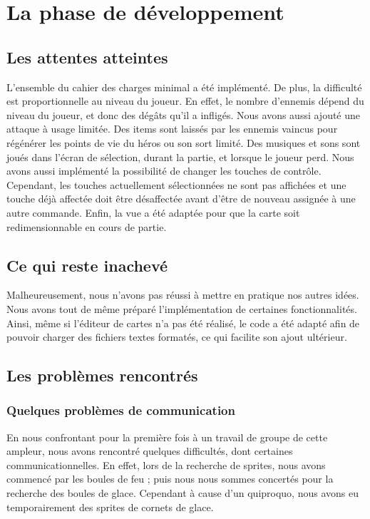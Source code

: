 \section{La phase de développement}

\subsection{Les attentes atteintes}

L'ensemble du cahier des charges minimal a été implémenté. De plus, la difficulté est proportionnelle au niveau du joueur. En effet, le nombre d'ennemis dépend du niveau du joueur, et donc des dégâts qu'il a infligés. Nous avons aussi ajouté une attaque à usage limitée. Des items sont laissés par les ennemis vaincus pour régénérer les points de vie du héros ou son sort limité. Des musiques et sons sont joués dans l'écran de sélection, durant la partie, et lorsque le joueur perd. Nous avons aussi implémenté la possibilité de changer les touches de contrôle. Cependant, les touches actuellement sélectionnées ne sont pas affichées et une touche déjà affectée doit être désaffectée avant d'être de nouveau assignée à une autre commande. Enfin, la vue a été adaptée pour que la carte soit redimensionnable en cours de partie. 

\subsection{Ce qui reste inachevé}

Malheureusement, nous n'avons pas réussi à mettre en pratique nos autres idées. Nous avons tout de même préparé l'implémentation de certaines fonctionnalités. Ainsi, même si l'éditeur de cartes n'a pas été réalisé, le code a été adapté afin de pouvoir charger des fichiers textes formatés, ce qui facilite son ajout ultérieur. 

\subsection{Les problèmes rencontrés}

	\subsubsection{Quelques problèmes de communication}
 
En nous confrontant pour la première fois à un travail de groupe de cette ampleur, nous avons rencontré quelques difficultés, dont certaines communicationnelles. En effet, lors de la recherche de sprites, nous avons commencé par les boules de feu ; puis nous nous sommes concertés pour la recherche des boules de glace. Cependant à cause d'un quiproquo, nous avons eu temporairement des sprites de cornets de glace. 

